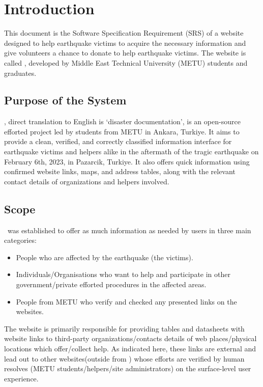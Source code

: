 \section{Introduction}

This document is the Software Specification Requirement (SRS) of a website designed to help earthquake victims to acquire the necessary information and give volunteers a chance to donate to help earthquake victims. The website is called \afetbilgi, developed by Middle East Technical University (METU) students and graduates.

\subsection{Purpose of the System}

\afetbilgi, direct translation to English is `disaster documentation', is an open-source efforted project led by students from METU in Ankara, Turkiye. It aims to provide a clean, verified, and correctly classified information interface for earthquake victims and helpers alike in the aftermath of the tragic earthquake on February 6th, 2023, in Pazarcik, Turkiye. It also offers quick information using confirmed website links, maps, and address tables, along with the relevant contact details of organizations and helpers involved.

\subsection{Scope}

\afetbilgi\ was established to offer as much information as needed by users in three main categories:
\begin{itemize}
  \item People who are affected by the earthquake (the victims).
  \item Individuals/Organisations who want to help and participate in other government/private efforted procedures in the affected areas.
  \item People from METU who verify and checked any presented links on the websites.
\end{itemize}

The website is primarily responsible for providing tables and datasheets with website links to third-party organizations/contacts details of web places/physical locations which offer/collect help. As indicated here, these links are external and lead out to other websites(outside from \afetbilgi) whose efforts are verified by human resolves (METU students/helpers/site administrators) on the surface-level user experience.

